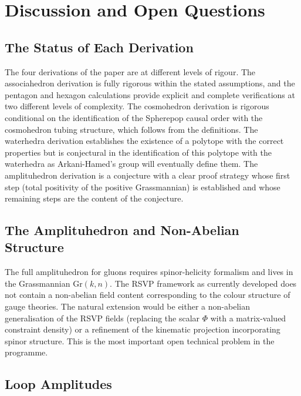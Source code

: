 \documentclass[12pt, oneside]{amsart}
\theoremstyle{plain}
\theoremstyle{definition}
\theoremstyle{remark}
\newcommand{\Gr}{\mathrm{Gr}}
\newcommand{\Phif}{\Phi}
\begin{document}
\section{Discussion and Open Questions}
\label{sec:discussion}

\subsection{The Status of Each Derivation}

The four derivations of the paper are at different levels of rigour. The associahedron derivation is fully rigorous within the stated assumptions, and the pentagon and hexagon calculations provide explicit and complete verifications at two different levels of complexity. The cosmohedron derivation is rigorous conditional on the identification of the Spherepop causal order with the cosmohedron tubing structure, which follows from the definitions. The waterhedra derivation establishes the existence of a polytope with the correct properties but is conjectural in the identification of this polytope with the waterhedra as Arkani-Hamed's group will eventually define them. The amplituhedron derivation is a conjecture with a clear proof strategy whose first step (total positivity of the positive Grassmannian) is established and whose remaining steps are the content of the conjecture.

\subsection{The Amplituhedron and Non-Abelian Structure}

The full amplituhedron for gluons requires spinor-helicity formalism and lives in the Grassmannian $\Gr(k,n)$. The RSVP framework as currently developed does not contain a non-abelian field content corresponding to the colour structure of gauge theories. The natural extension would be either a non-abelian generalisation of the RSVP fields (replacing the scalar $\Phif$ with a matrix-valued constraint density) or a refinement of the kinematic projection incorporating spinor structure. This is the most important open technical problem in the programme.

\subsection{Loop Amplitudes}
\end{document}
